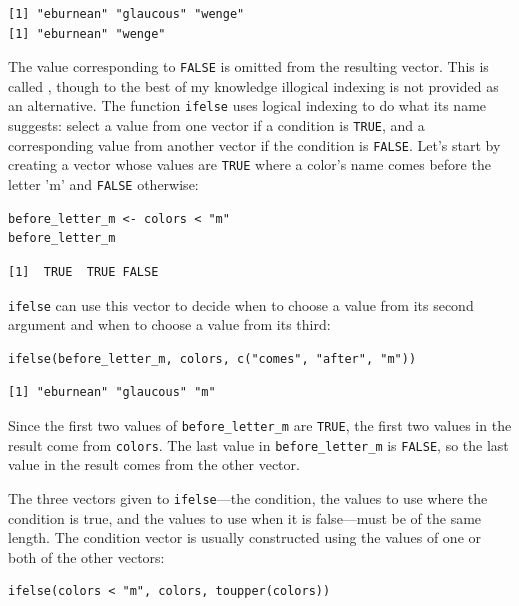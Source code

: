 \begin{lstlisting}
[1] "eburnean" "glaucous" "wenge"   
[1] "eburnean" "wenge"   
\end{lstlisting}

The value corresponding to \lstinline{FALSE} is omitted from the resulting vector.
This is called ,
though to the best of my knowledge illogical indexing is not provided as an alternative.
The function \texttt{ifelse} uses logical indexing to do what its name suggests:
select a value from one vector if a condition is \texttt{TRUE},
and a corresponding value from another vector if the condition is \texttt{FALSE}.
Let's start by creating a vector whose values are \texttt{TRUE}
where a color's name comes before the letter 'm'
and \texttt{FALSE} otherwise:

\begin{lstlisting}
before_letter_m <- colors < "m"
before_letter_m
\end{lstlisting}

\begin{lstlisting}
[1]  TRUE  TRUE FALSE
\end{lstlisting}

\texttt{ifelse} can use this vector to decide
when to choose a value from its second argument
and when to choose a value from its third:

\begin{lstlisting}
ifelse(before_letter_m, colors, c("comes", "after", "m"))
\end{lstlisting}

\begin{lstlisting}
[1] "eburnean" "glaucous" "m"       
\end{lstlisting}

Since the first two values of \texttt{before\_letter\_m} are \texttt{TRUE},
the first two values in the result come from \texttt{colors}.
The last value in \texttt{before\_letter\_m} is \texttt{FALSE},
so the last value in the result comes from the other vector.

The three vectors given to \texttt{ifelse}---the condition,
the values to use where the condition is true,
and the values to use when it is false---must
be of the same length.
The condition vector is usually constructed using the values of one or both of the other vectors:

\begin{lstlisting}
ifelse(colors < "m", colors, toupper(colors))
\end{lstlisting}

